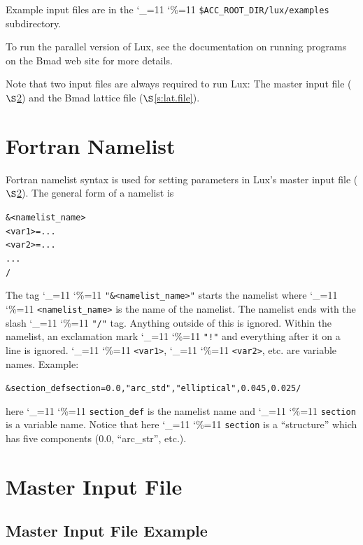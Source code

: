 \documentclass[11pt]{article}
\newcommand{\lux}{Lux\xspace}
\newcommand\ttcmd{\begingroup\catcode`\_=11 \catcode`\%=11 \dottcmd}
\newcommand\dottcmd[1]{\texttt{#1}\endgroup}
\newcommand{\vn}{\ttcmd}
\newcommand{\sref}[1]{$\S$\ref{#1}}
\newenvironment{example}
  {\vspace{\ExBeg} \begin{alltt}}
  {\end{alltt} \vspace{\ExEnd}}
\newlength{\ExBeg}
\newlength{\ExEnd}
\begin{document}
Example input files are in the \vn{\$ACC_ROOT_DIR/lux/examples} subdirectory.

To run the parallel version of \lux, see the documentation on running programs on the Bmad web site
for more details.

Note that two input files are always required to run \lux: The master input file
(\sref{s:master.file}) and the Bmad lattice file (\sref{s:lat.file}).

\section{Fortran Namelist}
\label{s:namelist}

Fortran namelist syntax is used for setting parameters in \lux's
master input file (\sref{s:master.file}). The general form of a
namelist is
\begin{example}
  &<namelist_name>
    <var1> = ...
    <var2> = ...
    ...
  /
\end{example}
The tag \vn{"\&<namelist_name>"} starts the namelist where
\vn{<namelist_name>} is the name of the namelist. The namelist ends
with the slash \vn{"/"} tag. Anything outside of this is
ignored. Within the namelist, an exclamation mark \vn{"!"} and
everything after it on a line is ignored. \vn{<var1>}, \vn{<var2>},
etc. are variable names. Example:
\begin{example}
  &section_def section =   0.0, "arc_std", "elliptical", 0.045, 0.025 /
\end{example}
here \vn{section_def} is the namelist name and \vn{section} is a variable
name.  Notice that here \vn{section} is a ``structure'' which has five
components (0.0, ``arc_str'', etc.).



\section{Master Input File} 
\label{s:master.file}

\subsection{Master Input File Example}
\label{ss:master.example}
\end{document}
